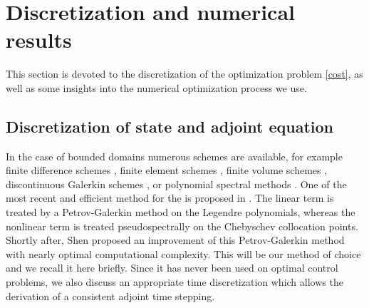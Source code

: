 \section{Discretization and numerical results}
\label{secnum}
This section is devoted to the discretization of the optimization problem \eqref{cost}, as well as some insights into the numerical optimization process we use.
\subsection{Discretization of state and adjoint equation}
In the case of bounded domains numerous schemes are available, for example finite difference schemes \cite{djidjeli1995numerical,zabusky1965interaction}, finite element schemes \cite{winther1980conservative,arnold1982superconvergent}, finite volume schemes \cite{dutykh2013finite}, discontinuous Galerkin schemes \cite{Bona1986859,yan2002local}, or polynomial spectral methods \cite{ma2000legendre,ma2001optimal,shen2003new}. One of the most recent and efficient method for the \KdV is proposed in \cite{ma2000legendre}. The linear term is treated by a Petrov-Galerkin method on the Legendre polynomials, whereas the nonlinear term is treated pseudospectrally on the Chebyschev collocation points. Shortly after, Shen \cite{shen2003new} proposed an improvement of this Petrov-Galerkin method with nearly optimal computational complexity. This will be our method of choice and we recall it here briefly. Since it has never been used on optimal control problems, we also discuss an appropriate time discretization which allows the derivation of a consistent adjoint time stepping.

